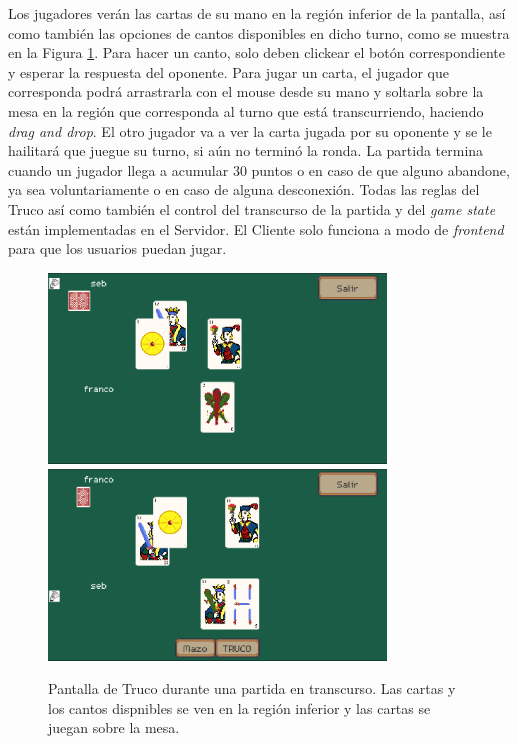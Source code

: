 Los jugadores verán las cartas de su mano en la región inferior de la pantalla, así como también las opciones
de cantos disponibles en dicho turno, como se muestra en la Figura \ref{fig:truco-game}.
Para hacer un canto, solo deben clickear el botón correspondiente
y esperar la respuesta del oponente. Para jugar un carta, el jugador que corresponda podrá arrastrarla con el
mouse desde su mano y soltarla sobre la mesa en la región que corresponda al turno que está transcurriendo,
haciendo \textit{drag and drop}. El otro jugador va a ver la carta jugada por su oponente y se le hailitará
que juegue su turno, si aún no terminó la ronda.
La partida termina cuando un jugador llega a acumular 30 puntos o en caso de que alguno abandone, ya sea 
voluntariamente o en caso de alguna desconexión.
Todas las reglas del Truco así como también el control del transcurso de la partida y del \textit{game state}
están implementadas en el Servidor. El Cliente solo funciona a modo de \textit{frontend} para que los
usuarios puedan jugar.

\begin{figure}[htbp]
    \centering
    \includegraphics[width=0.8\textwidth]{../assets/godot-truco-1.png}
    \includegraphics[width=0.8\textwidth]{../assets/godot-truco-2.png}
    \caption{Pantalla de Truco durante una partida en transcurso. Las cartas y los cantos dispnibles se
            ven en la región inferior y las cartas se juegan sobre la mesa.}
    \label{fig:truco-game}
\end{figure}

